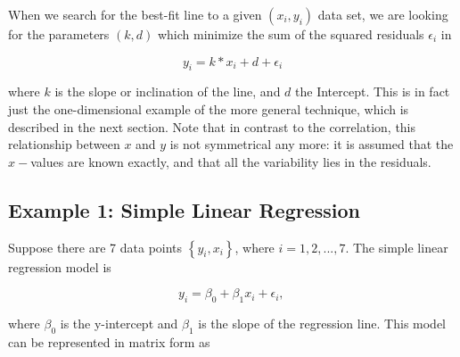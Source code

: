 When we search for the best-fit line to a given $(x_i,y_i)$ data set, we are looking for the parameters $(k,d)$ which minimize the sum of the squared residuals $\epsilon_i$ in

\begin{equation}\label{eq:simpleRegression}
  y_i = k * x_i + d + \epsilon_i
\end{equation}

where $k$ is the slope or inclination of the line, and $d$ the Intercept. This is in fact just the one-dimensional example of the more general technique, which is described in the next section.
Note that in contrast to the correlation, this relationship between $x$ and $y$ is not symmetrical any more: it is assumed that the $x-$values are known exactly, and that all the variability lies in the residuals.

\subsection{Example 1: Simple Linear Regression}

Suppose there are 7 data points $\left\{ {{y_i},{x_i}} \right\}$, where $i=1,2,...,7$. The simple linear regression model is

\begin{equation}
  y_i = \beta_0 + \beta_1 x_i +\epsilon_i, \,
\end{equation}

where $\beta_0$ is the y-intercept and $\beta_1$ is the slope of the regression line. This model can be represented in matrix form as

